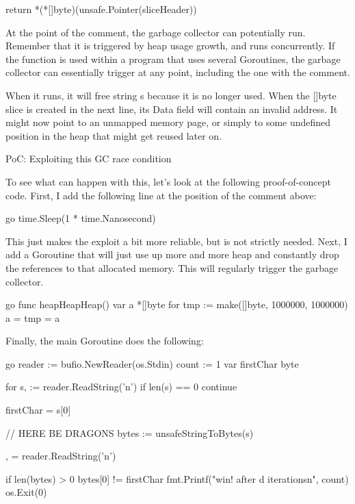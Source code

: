         return *(*[]byte)(unsafe.Pointer(sliceHeader))



        At the point of the comment, the garbage collector can potentially run. Remember that it is triggered by heap usage
        growth, and runs concurrently. If the function is used within a program that uses several Goroutines, the garbage
        collector can essentially trigger at any point, including the one with the comment.

        When it runs, it will free string s because it is no longer used. When the []byte slice is created in the next line,
        its Data field will contain an invalid address. It might now point to an unmapped memory page, or simply to some
        undefined position in the heap that might get reused later on.


        PoC: Exploiting this GC race condition

        To see what can happen with this, let's look at the following proof-of-concept code. First, I add the following line
        at the position of the comment above:

        go
        time.Sleep(1 * time.Nanosecond)


        This just makes the exploit a bit more reliable, but is not strictly needed. Next, I add a Goroutine that will just use
        up more and more heap and constantly drop the references to that allocated memory. This will regularly trigger the
        garbage collector.

        go
        func heapHeapHeap()
        var a *[]byte
        for
        tmp := make([]byte, 1000000, 1000000)
        a = tmp
        = a




        Finally, the main Goroutine does the following:

        go
        reader := bufio.NewReader(os.Stdin)
        count := 1
        var firstChar byte

        for
        s,  := reader.ReadString('n')
        if len(s) == 0
        continue

        firstChar = s[0]

        // HERE BE DRAGONS
        bytes := unsafeStringToBytes(s)

        ,  = reader.ReadString('n')

        if len(bytes) > 0  bytes[0] != firstChar
        fmt.Printf("win! after d iterationsn", count)
        os.Exit(0)


